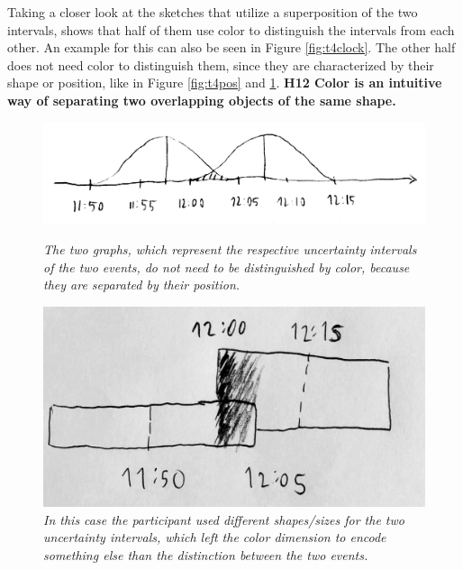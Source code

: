 Taking a closer look at the sketches that utilize a superposition of the two intervals, shows that half of them use color to distinguish the intervals from each other. An example for this can also be seen in Figure \ref{fig:t4clock}. The other half does not need color to distinguish them, since they are characterized by their shape or position, like in Figure \ref{fig:t4pos} and \ref{fig:t4shape}. \textbf{H12 Color is an intuitive way of separating two overlapping objects of the same shape.}\par \medskip

\begin{figure}[H]
	\begin{minipage}{.5\textwidth}
		\centering
		\captionsetup{width=0.8\textwidth}
		\includegraphics[height=0.28\textwidth]{figures/t4pos.png}
		\caption{\textit{The two graphs, which represent the respective uncertainty intervals of the two events, do not need to be distinguished by color, because they are separated by their position.}}
		\label{fig:t4pos}
	\end{minipage}
	\begin{minipage}{.5\textwidth}
		\centering
		\captionsetup{width=1.0\textwidth}
		\includegraphics[height=0.45\textwidth]{figures/t4shape.jpg}
		\caption{\textit{In this case the participant used different shapes/sizes for the two uncertainty intervals, which left the color dimension to encode something else than the distinction between the two events.}}
		\label{fig:t4shape}
	\end{minipage}
\end{figure}
